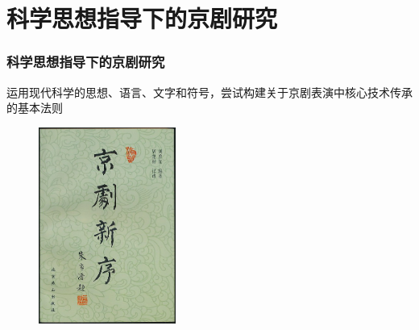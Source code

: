 \section{科学思想指导下的京剧研究}
\frame
{
	\frametitle{科学思想指导下的京剧研究}
	运用现代科学的思想、语言、文字和符号，尝试构建关于京剧表演中核心技术传承的基本法则
\begin{figure}[h!]
\centering
\vspace{-0.1in}
\includegraphics[height=0.58\textwidth,width=0.40\textwidth,viewport=0 0 449 644,clip]{Figures/Liu-Xinxu.jpg}
\label{Liu_Xinxu}
\end{figure}
}

